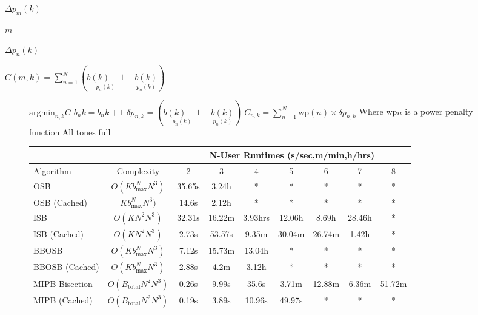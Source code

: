 {{\begin{figure}
\end{figure}%
\lthtmlfigureZ
\lthtmlcheckvsize\clearpage}

{\newpage\clearpage
{}%
$ \Delta p_m(k)$%
\lthtmlinlinemathZ
\lthtmlcheckvsize\clearpage}

{\newpage\clearpage
{}%
$ m$%
\lthtmlinlinemathZ
\lthtmlcheckvsize\clearpage}

{\newpage\clearpage
{}%
$ \Delta p_n(k)$%
\lthtmlinlinemathZ
\lthtmlcheckvsize\clearpage}

{\newpage\clearpage
{}%
$\displaystyle C(m,k)=\sum\limits_{n=1}^N\left(\underset{p_n(k)}{b(k)+1} - \underset{p_n(k)}{b(k)}\right)$%
\lthtmlindisplaymathZ
\lthtmlcheckvsize\clearpage}

{\newpage\clearpage
{}%
\begin{figure}\begin{algorithmic}
\REPEAT
\STATE \(\text{argmin}_{n,k} C\)
\STATE \(b_n{k}=b_n{k}+1\)
  \STATE \(\delta p_{n,k}=\left(\underset{p_n(k)}{b(k)+1} - \underset{p_n(k)}{b(k)}\right)\)
\ENDFOR
{}
    \STATE \(C_{n,k}=\sum\limits_{n=1}^N \text{wp}(n)\times\delta p_{n,k}\)
    \STATE Where wp\(n\) is a power penalty function
  \ENDFOR
\ENDFOR
\UNTIL All tones full
\end{algorithmic}

\end{figure}%
\lthtmlfigureZ
\lthtmlcheckvsize\clearpage}

{\newpage\clearpage
{}%
\begin{figure}  \begin{tabularx}{1.1\textwidth}{|X|c|c|c|c|c|c|c|c|}\hline
  &&\multicolumn{7}{|c|}{N-User Runtimes (s/sec,m/min,h/hrs)}\\\hline
  Algorithm&Complexity&2&3&4&5&6&7&8\\\hline
  OSB&\(O(K b_{\text{max}}^N N^3)\)&35.65s&3.24h&*&*&*&*&*\\\hline
  OSB (Cached)&\(K b_{\text{max}}^N N^3)\)&14.6s&2.12h&*&*&*&*&*\\\hline
  ISB&\(O(K N^2 N^3)\)&32.31s&16.22m&3.93hrs&12.06h&8.69h&28.46h&*\\\hline
  ISB (Cached)&\(O(K N^2 N^3)\)&2.73s&53.57s&9.35m&30.04m&26.74m&1.42h&*\\\hline
  BBOSB&\(O(K b_{\text{max}}^N N^3)\)&7.12s&15.73m&13.04h&*&*&*&*\\\hline
  BBOSB (Cached)&\(O(K b_{\text{max}}^N N^3)\)&2.88s&4.2m&3.12h&*&*&*&*\\\hline
  MIPB Bisection&\(O(B_{\text{total}} N^2 N^3)\)&0.26s&9.99s&35.6s&3.71m&12.88m&6.36m&51.72m\\\hline
  MIPB (Cached)&\(O(B_{\text{total}} N^2 N^3)\)&0.19s&3.89s&10.96s&49.97s&*&*&*\\\hline
\end{tabularx}


\end{figure}}}
